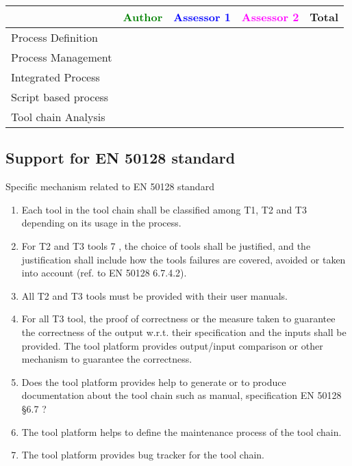 \begin{tabular}{|l | c | c | c | c|} \hline
  & \textcolor{green}{Author} & \textcolor{blue}{Assessor 1} &  \textcolor{magenta}{Assessor 2} & Total \\
  \hline Process Definition &
  &                 &                  &\\
  \hline Process Management &
  &                 &                  &\\
  \hline Integrated Process &
  &                 &                  &\\
  \hline Script based process &
  &                 &                  &\\
  \hline Tool chain Analysis &
  &                 &                  &\\
  \hline
\end{tabular}



\subsection{Support for EN 50128 standard}
Specific mechanism related to EN 50128 standard
\begin{enumerate}
\item  Each tool in the tool chain shall be classified among T1, T2
  and T3 depending on its usage in the process.
\item  For T2 and T3 tools 7 , the choice of tools shall be justified,
  and the justification shall include how the tools failures are
  covered, avoided or taken into account (ref. to EN 50128 6.7.4.2).
\item  All T2 and T3 tools must be provided with their user manuals.
\item  For all T3 tool, the proof of correctness or the measure taken
  to guarantee the correctness of the output w.r.t. their
  specification and the inputs shall be provided. The tool platform
  provides output/input comparison  or other mechanism to guarantee
  the correctness.
\item Does the tool platform provides help to generate or to produce
  documentation about the tool chain such as manual, specification  EN
  50128 §6.7 ?
\item The tool platform helps to define the maintenance process of the
  tool chain.
\item The tool platform provides bug tracker for the tool chain.
\end{enumerate}

